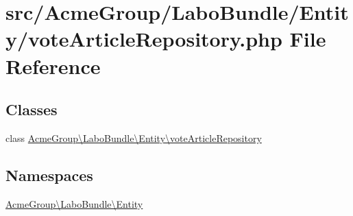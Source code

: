 \hypertarget{vote_article_repository_8php}{\section{src/\+Acme\+Group/\+Labo\+Bundle/\+Entity/vote\+Article\+Repository.php File Reference}
\label{vote_article_repository_8php}
}
\subsection*{Classes}
\begin{DoxyCompactItemize}
\item 
class \hyperlink{class_acme_group_1_1_labo_bundle_1_1_entity_1_1vote_article_repository}{Acme\+Group\textbackslash{}\+Labo\+Bundle\textbackslash{}\+Entity\textbackslash{}vote\+Article\+Repository}
\end{DoxyCompactItemize}
\subsection*{Namespaces}
\begin{DoxyCompactItemize}
\item 
 \hyperlink{namespace_acme_group_1_1_labo_bundle_1_1_entity}{Acme\+Group\textbackslash{}\+Labo\+Bundle\textbackslash{}\+Entity}
\end{DoxyCompactItemize}
